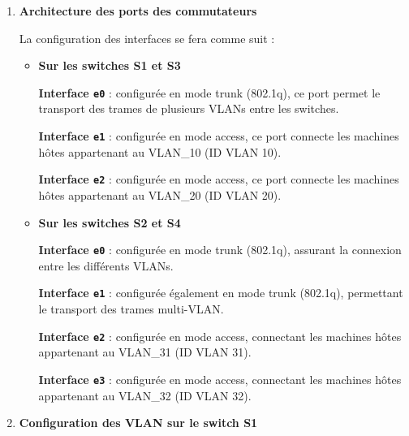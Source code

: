 \documentclass[12pt,a4paper, oneside]{memoir}
\begin{document}
	\begin{enumerate}
		\item \textbf{Architecture des ports des commutateurs}

La configuration des interfaces se fera comme suit :
		\begin{itemize}
			\item \textbf{Sur les switches S1 et S3}

\textbf{Interface \texttt{e0}} : configurée en mode trunk (802.1q), ce port permet le transport des trames de plusieurs VLANs entre les switches.

\textbf{Interface \texttt{e1}} : configurée en mode access, ce port connecte les machines hôtes appartenant au VLAN\_10 (ID VLAN 10).

\textbf{Interface \texttt{e2}} : configurée en mode access, ce port connecte les machines hôtes appartenant au VLAN\_20 (ID VLAN 20).

		\item \textbf{Sur les switches S2 et S4}

\textbf{Interface \texttt{e0}} : configurée en mode trunk (802.1q), assurant la connexion entre les différents VLANs.

\textbf{Interface \texttt{e1}} : configurée également en mode trunk (802.1q), permettant le transport des trames multi-VLAN.

\textbf{Interface \texttt{e2}} : configurée en mode access, connectant les machines hôtes appartenant au VLAN\_31 (ID VLAN 31).

\textbf{Interface \texttt{e3}} : configurée en mode access, connectant les machines hôtes appartenant au VLAN\_32 (ID VLAN 32).
	\end{itemize}

	\item \textbf{Configuration des VLAN sur le switch S1}


\end{enumerate}
\end{document}
